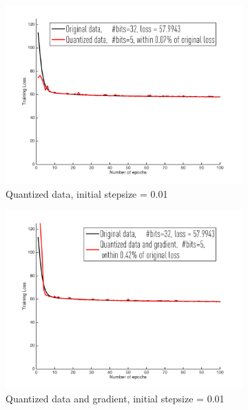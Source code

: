 \documentclass{article}
\begin{document}
\begin{figure}[h]
\centering
 
    \begin{subfigure}[h]{.3\columnwidth}
    \includegraphics[width=\columnwidth]{lr/real/YearPredictionMSD/d001}
    \caption{Quantized data, initial stepsize = 0.01}
    \end{subfigure}
    \begin{subfigure}[h]{.3\columnwidth}
    \includegraphics[width=\columnwidth]{lr/real/YearPredictionMSD/dg001}
    \caption{Quantized data and gradient, initial stepsize = 0.01}
    \end{subfigure}
    \begin{subfigure}[h]{.3\columnwidth}

\end{subfigure}
\end{figure}
\end{document}
